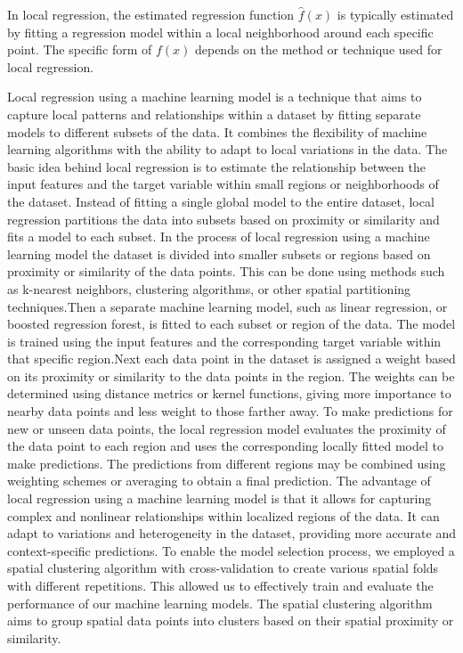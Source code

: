 \documentclass[
  12pt,
]{article}
\begin{document}
In local regression, the estimated regression function \(\hat{f}(x)\) is typically estimated by fitting a regression model within a local neighborhood around each specific point.
The specific form of \(f(x)\) depends on the method or technique used for local regression.

Local regression using a machine learning model is a technique that aims to capture local patterns and relationships within a dataset by fitting separate models to different subsets of the data. It combines the flexibility of machine learning algorithms with the ability to adapt to local variations in the data.
The basic idea behind local regression is to estimate the relationship between the input features and the target variable within small regions or neighborhoods of the dataset. Instead of fitting a single global model to the entire dataset, local regression partitions the data into subsets based on proximity or similarity and fits a model to each subset.
In the process of local regression using a machine learning model the dataset is divided into smaller subsets or regions based on proximity or similarity of the data points. This can be done using methods such as k-nearest neighbors, clustering algorithms, or other spatial partitioning techniques.Then a separate machine learning model, such as linear regression, or boosted regression forest, is fitted to each subset or region of the data. The model is trained using the input features and the corresponding target variable within that specific region.Next each data point in the dataset is assigned a weight based on its proximity or similarity to the data points in the region. The weights can be determined using distance metrics or kernel functions, giving more importance to nearby data points and less weight to those farther away. To make predictions for new or unseen data points, the local regression model evaluates the proximity of the data point to each region and uses the corresponding locally fitted model to make predictions. The predictions from different regions may be combined using weighting schemes or averaging to obtain a final prediction.
The advantage of local regression using a machine learning model is that it allows for capturing complex and nonlinear relationships within localized regions of the data. It can adapt to variations and heterogeneity in the dataset, providing more accurate and context-specific predictions.
To enable the model selection process, we employed a spatial clustering algorithm with cross-validation to create various spatial folds with different repetitions. This allowed us to effectively train and evaluate the performance of our machine learning models. The spatial clustering algorithm aims to group spatial data points into clusters based on their spatial proximity or similarity.
\end{document}
